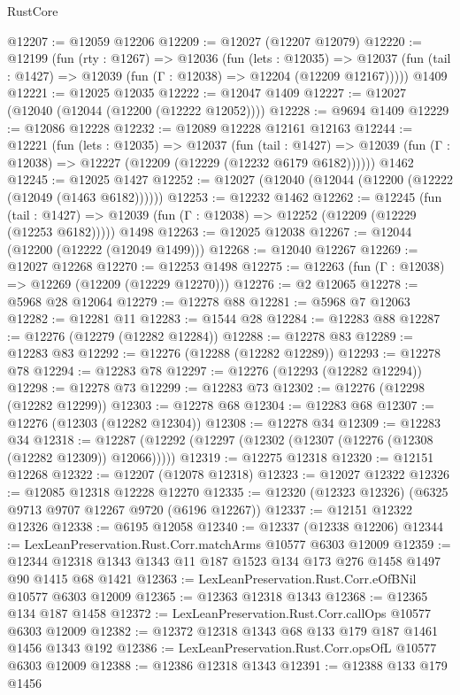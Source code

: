 \begin{lexlean}{RustCore}
\begin{coremodule}
@12207 := @12059 @12206
@12209 := @12027 (@12207 @12079)
@12220 := @12199
    (fun (rty : @1267) =>
    @12036
      (fun (lets : @12035) =>
      @12037 (fun (tail : @1427) => @12039 (fun (Γ : @12038) => @12204 (@12209 @12167)))))
    @1409
@12221 := @12025 @12035
@12222 := @12047 @1409
@12227 := @12027 (@12040 (@12044 (@12200 (@12222 @12052))))
@12228 := @9694 @1409
@12229 := @12086 @12228
@12232 := @12089 @12228 @12161 @12163
@12244 := @12221
    (fun (lets : @12035) =>
    @12037
      (fun (tail : @1427) =>
      @12039 (fun (Γ : @12038) => @12227 (@12209 (@12229 (@12232 @6179 @6182))))))
    @1462
@12245 := @12025 @1427
@12252 := @12027 (@12040 (@12044 (@12200 (@12222 (@12049 (@1463 @6182))))))
@12253 := @12232 @1462
@12262 := @12245
    (fun (tail : @1427) => @12039 (fun (Γ : @12038) => @12252 (@12209 (@12229 (@12253 @6182)))))
    @1498
@12263 := @12025 @12038
@12267 := @12044 (@12200 (@12222 (@12049 @1499)))
@12268 := @12040 @12267
@12269 := @12027 @12268
@12270 := @12253 @1498
@12275 := @12263 (fun (Γ : @12038) => @12269 (@12209 (@12229 @12270)))
@12276 := @2 @12065
@12278 := @5968 @28 @12064
@12279 := @12278 @88
@12281 := @5968 @7 @12063
@12282 := @12281 @11
@12283 := @1544 @28
@12284 := @12283 @88
@12287 := @12276 (@12279 (@12282 @12284))
@12288 := @12278 @83
@12289 := @12283 @83
@12292 := @12276 (@12288 (@12282 @12289))
@12293 := @12278 @78
@12294 := @12283 @78
@12297 := @12276 (@12293 (@12282 @12294))
@12298 := @12278 @73
@12299 := @12283 @73
@12302 := @12276 (@12298 (@12282 @12299))
@12303 := @12278 @68
@12304 := @12283 @68
@12307 := @12276 (@12303 (@12282 @12304))
@12308 := @12278 @34
@12309 := @12283 @34
@12318 := @12287 (@12292 (@12297 (@12302 (@12307 (@12276 (@12308 (@12282 @12309)) @12066)))))
@12319 := @12275 @12318
@12320 := @12151 @12268
@12322 := @12207 (@12078 @12318)
@12323 := @12027 @12322
@12326 := @12085 @12318 @12228 @12270
@12335 := @12320 (@12323 @12326) (@6325 @9713 @9707 @12267 @9720 (@6196 @12267))
@12337 := @12151 @12322 @12326
@12338 := @6195 @12058
@12340 := @12337 (@12338 @12206)
@12344 := LexLeanPreservation.Rust.Corr.matchArms @10577 @6303 @12009
@12359 := @12344 @12318 @1343 @1343 @11 @187 @1523 @134 @173 @276 @1458 @1497 @90 @1415 @68 @1421
@12363 := LexLeanPreservation.Rust.Corr.eOfBNil @10577 @6303 @12009
@12365 := @12363 @12318 @1343
@12368 := @12365 @134 @187 @1458
@12372 := LexLeanPreservation.Rust.Corr.callOps @10577 @6303 @12009
@12382 := @12372 @12318 @1343 @68 @133 @179 @187 @1461 @1456 @1343 @192
@12386 := LexLeanPreservation.Rust.Corr.opsOfL @10577 @6303 @12009
@12388 := @12386 @12318 @1343
@12391 := @12388 @133 @179 @1456

\end{coremodule}
\end{lexlean}
